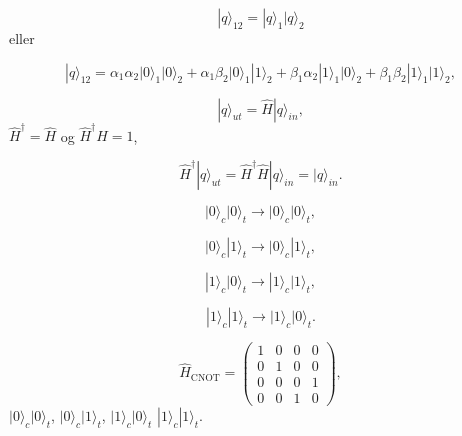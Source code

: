 \documentclass[%
oneside,                 %
final,                   %
10pt]{article}
\begin{document}
\begin{equation}
     |q\rangle_{12}= |q\rangle_{1} |q\rangle_{2}
\end{equation}
eller

\begin{equation}
   |q\rangle_{12}=\alpha_1 \alpha_2\vert 0 \rangle_1\vert 0 \rangle_2 +
                  \alpha_1 \beta_2\vert 0 \rangle_1|1\rangle_2 +
                  \beta_1 \alpha_2|1\rangle_1\vert 0 \rangle_2 +
                  \beta_1 \beta_2|1\rangle_1|1\rangle_2,
\end{equation}

\begin{equation} 
   |q\rangle_{ut}=\hat{H}|q\rangle_{in},
\end{equation}
$\hat{H}^{\dagger}=\hat{H}$ og $\hat{H}^{\dagger}\hat{H}=1$, 

\begin{equation} 
   \hat{H}^{\dagger}|q\rangle_{ut}=\hat{H}^{\dagger}\hat{H}|q\rangle_{in}=
   |q\rangle_{in}.
\end{equation}

\begin{equation}
   \vert 0 \rangle_{c}  \vert 0 \rangle_{t}\rightarrow
   \vert 0 \rangle_{c}  \vert 0 \rangle_{t},
\end{equation}

\begin{equation}
   \vert 0 \rangle_{c}  |1\rangle_{t}\rightarrow
   \vert 0 \rangle_{c}  |1\rangle_{t},
\end{equation}

\begin{equation}
   |1\rangle_{c}  \vert 0 \rangle_{t}\rightarrow
   |1\rangle_{c}  |1\rangle_{t},
\end{equation}

\begin{equation}
   |1\rangle_{c}  |1\rangle_{t}\rightarrow
   |1\rangle_{c}  \vert 0 \rangle_{t}.
\end{equation}

\begin{equation}
   \hat{H}_{\mathrm{CNOT}}=
    \left(\begin{array}{cccc} 1 & 0 & 0 &0  \\ 
                              0 & 1 & 0 &0  \\
                              0& 0 & 0 &1  \\
                              0 & 0 & 1 &0\end{array}\right),
\end{equation}
$\vert 0 \rangle_c\vert 0 \rangle_t$, $\vert 0 \rangle_c|1\rangle_t$, $|1\rangle_c\vert 0 \rangle_t$ 
$|1\rangle_c|1\rangle_t$.
\end{document}
